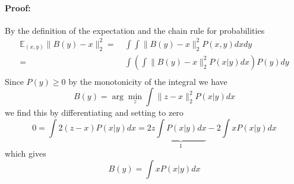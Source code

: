 \documentclass[a4paper,10pt]{article}
\begin{document}
	\paragraph{Proof:} By the definition of the expectation and the chain rule for probabilities
	\begin{align*}
		\mathbb{E}_{(x, y)} \|B(y) - x\|_2^2
		=&\ \int \int \|B(y) - x\|_2^2 P(x, y) dx dy \\
		=&\ \int \left(\int \|B(y) - x\|_2^2 P(x | y) dx \right) P(y) dy \\
	\end{align*}
	Since $P(y) \geq 0$ by the monotonicity of the integral we have
	\[
		B(y) = \arg\min_{z} \int \|z - x\|_2^2 P(x | y) dx
	\]
	we find this by differentiating and setting to zero
	\[
		0 = \int 2(z - x) P(x | y) dx = 2 z \underbrace{\int P(x | y) dx}_{1} - 2 \int x P(x | y) dx
	\]
	which gives
	\[
		B(y) = \int x P(x | y) dx
	\]
	
\end{document}
